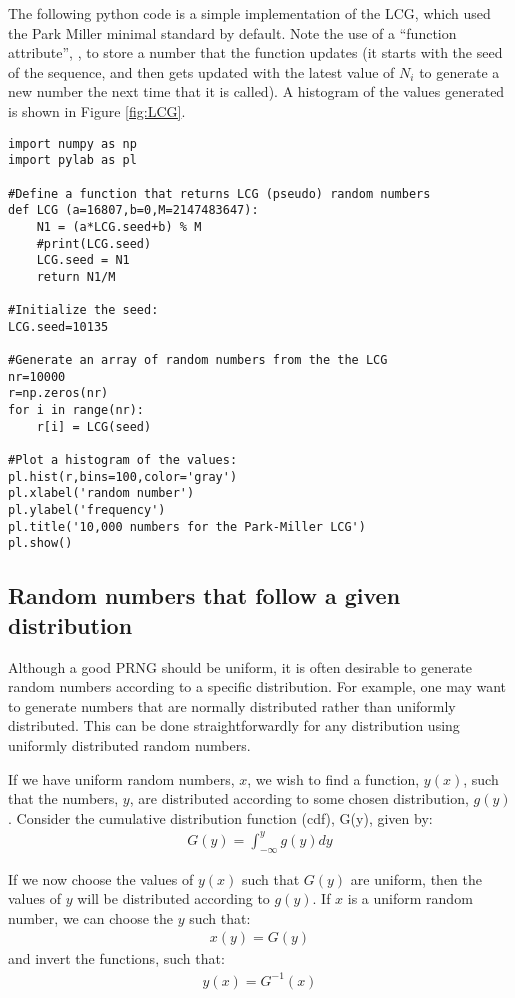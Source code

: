 The following python code is a simple implementation of the LCG, which used the Park Miller minimal standard by default. Note the use of a ``function attribute'', , to store a number that the  function updates (it starts with the seed of the sequence, and then gets updated with the latest value of $N_i$ to generate a new number the next time that it is called). A histogram of the values generated is shown in Figure \ref{fig:LCG}.
\begin{lstlisting}[frame=single] 
import numpy as np
import pylab as pl

#Define a function that returns LCG (pseudo) random numbers
def LCG (a=16807,b=0,M=2147483647):
    N1 = (a*LCG.seed+b) % M
    #print(LCG.seed)
    LCG.seed = N1
    return N1/M

#Initialize the seed:
LCG.seed=10135

#Generate an array of random numbers from the the LCG
nr=10000
r=np.zeros(nr)
for i in range(nr):
    r[i] = LCG(seed)

#Plot a histogram of the values:
pl.hist(r,bins=100,color='gray')
pl.xlabel('random number')
pl.ylabel('frequency')
pl.title('10,000 numbers for the Park-Miller LCG')
pl.show()
\end{lstlisting}


\subsection{Random numbers that follow a given distribution}
Although a good PRNG should be uniform, it is often desirable to generate random numbers according to a specific distribution. For example, one may want to generate numbers that are normally distributed rather than uniformly distributed. This can be done straightforwardly for any distribution using uniformly distributed random numbers.

If we have uniform random numbers, $x$, we wish to find a function, $y(x)$, such that the numbers, $y$, are distributed according to some chosen distribution, $g(y)$. Consider the cumulative distribution function (cdf), G(y), given by:
\begin{align*}
G(y) = \int_{-\infty}^y g(y)dy
\end{align*}

If we now choose the values of $y(x)$ such that $G(y)$ are uniform, then the values of $y$ will be distributed according to $g(y)$. If $x$ is a uniform random number, we can choose the $y$ such that:
\begin{align*}
x(y) = G(y)
\end{align*}
and invert the functions, such that:
\begin{align*}
y(x) = G^{-1}(x)
\end{align*}

